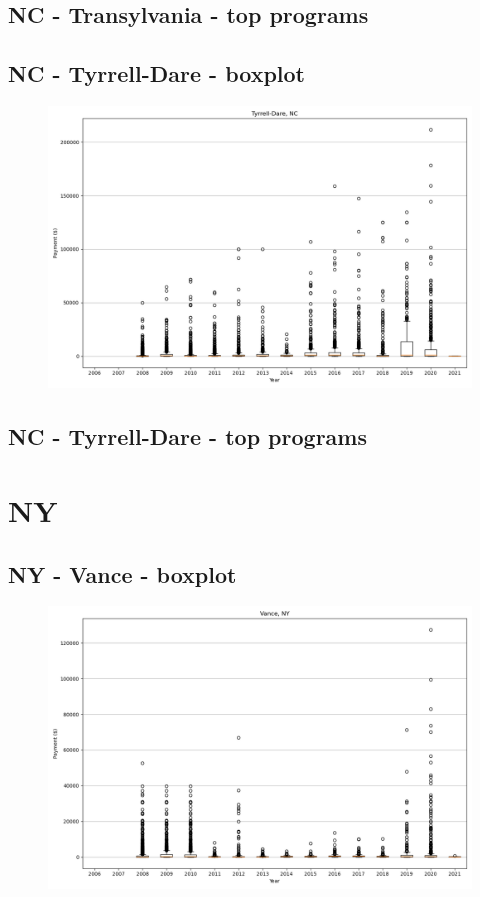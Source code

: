 \subsection*{NC - Transylvania - top programs}

\newpage
\subsection*{NC - Tyrrell-Dare - boxplot}
\begin{figure}[h]
\centering
\includegraphics[width=7in]{../output/boxplots/counties/Tyrrell-Dare-NC_boxplot.png}
\end{figure}


\subsection*{NC - Tyrrell-Dare - top programs}

\newpage
\section*{NY}
\subsection*{NY - Vance - boxplot}
\begin{figure}[h]
\centering
\includegraphics[width=7in]{../output/boxplots/counties/Vance-NY_boxplot.png}
\end{figure}


